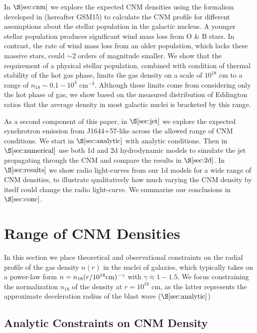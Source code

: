 \documentclass[usenatbib,fleqn]{mnras}
\begin{document}
In $\S\ref{sec:cnm}$ we explore the expected CNM densities using the
formalism developed in \citet{Generozov+2015} (hereafter GSM15) to
calculate the CNM profile for different assumptions about the stellar
population in the galactic nucleus.  A younger stellar population
produces significant wind mass loss from O \& B stars. In contrast,
the rate of wind mass loss from an older population, which lacks these
massive stars, could $\sim 2$ orders of magnitude smaller.  We show
that the requirement of a physical stellar population, combined with
condition of thermal stability of the hot gas phase, limits the gas
density on a scale of $10^{18}$ cm to a range of $n_{18} \sim
0.1-10^{3}$ cm$^{-3}$.  Although these limits come from considering
only the hot phase of gas, we show based on the measured distribution
of Eddington ratios that the average density in most galactic nuclei
is bracketed by this range. 

As a second component of this paper, in $\S\ref{sec:jet}$ we
explore the expected synchrotron emission from J1644+57-like across
the allowed range of CNM conditions.  We start in
$\S\ref{sec:analytic}$ with analytic conditions.  Then in
$\S\ref{sec:numerical}$ use both 1d and 2d hydrodynamic models to
simulate the jet propagating through the CNM and compare the results
in $\S\ref{sec:2d}$. In $\S\ref{sec:results}$ we show radio
light-curves from our 1d models for a wide range of CNM densities, to
illustrate qualitatively how much varying the CNM density by itself
could change the radio light-curve.  We summarize our conclusions in
$\S\ref{sec:conc}$.

\section{Range of CNM Densities}
\label{sec:cnm}

In this section we place theoretical and observational constraints on
the radial profile of the gas density $n(r)$ in the nuclei of
galaxies, which typically takes on a power-law form $n =
n_{18}(r/10^{18}{\rm cm})^{-\gamma}$ with $\gamma \approx 1-1.5$.  We
focus constraining the normalization $n_{18}$ of the density at $r =
10^{18}$ cm, as the latter represents the approximate deceleration
radius of the blast wave ($\S\ref{sec:analytic}$)

\subsection{Analytic Constraints on CNM Density}
\end{document}
